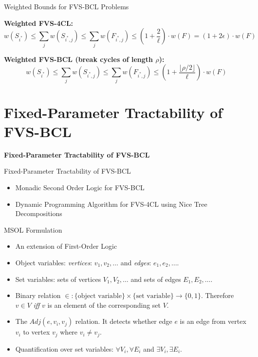 \documentclass{beamer}
\begin{document}
\begin{frame}{Weighted Bounds for FVS-BCL Problems}

\textbf{Weighted FVS-4CL:}
\[
w(S_{i^*}) \leq \sum\limits_j w(S_{i^*, j}) \leq \sum\limits_j w(F_{i^*, j}) \leq \left(1 + \frac{2}{\ell}\right) \cdot w(F) = \left(1+2\epsilon\right)\cdot w(F)
\]

\vspace{1em}

\textbf{Weighted FVS-BCL (break cycles of length $\rho$):}
\[
w(S_{i^*}) \leq \sum\limits_j w(S_{i^*, j}) \leq \sum\limits_j w(F_{i^*, j}) \leq \left(1 + \frac{\lfloor\rho/2\rfloor}{\ell}\right) \cdot w(F)
\]

\end{frame}

\section{Fixed-Parameter Tractability of FVS-BCL}

\begin{frame}
  \centering
  \vfill
  \LARGE \textbf{Fixed-Parameter Tractability of FVS-BCL}
  \vfill
\end{frame}


\begin{frame}{Fixed-Parameter Tractability of FVS-BCL}
  \begin{itemize}
    \item Monadic Second Order Logic for FVS-BCL
    \item Dynamic Programming Algorithm for FVS-4CL using Nice Tree Decompositions
  \end{itemize}
\end{frame}

\begin{frame}{MSOL Formulation}
  \begin{itemize}
    \item An extension of First-Order Logic
    \item Object variables: \textit{vertices}: $v_1, v_2, \dots$ and \textit{edges}: $e_1, e_2, \dots$. 
    \item Set variables: sets of vertices $V_1, V_2, \dots$ and sets of edges $E_1, E_2, \dots$.
    \item Binary relation $\in : \{\text{object variable}\} \times \{\text{set variable}\} \to \{0, 1\}$. Therefore 
    $v \in V$ \textit{iff} $v$ is an element of the corresponding set $V$.
    \item The $Adj(e, v_i, v_j)$ relation. It detects whether edge $e$ is an edge from vertex $v_i$ to 
    vertex $v_j$ where $v_i \neq v_j$.
    \item Quantification over set variables: $\forall V_i, \forall E_i$ and $\exists V_i, \exists E_i$.
  \end{itemize}
\end{frame}
\end{document}

